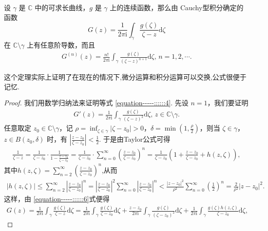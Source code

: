 \documentclass[../../main.tex]{subfiles}%
\begin{document}
\begin{theorem}\label{theorem:定理3.4.2}
设 \( \gamma \) 是 \( \mathbb{C} \) 中的可求长曲线，\( g \) 是 \( \gamma \) 上的连续函数，那么由 Cauchy型积分确定的函数
\[
G(z) = \frac{1}{2\pi \mathrm{i}} \int_{\gamma} \frac{g(\zeta)}{\zeta - z} \mathrm{d}\zeta
\]
在 \( \mathbb{C} \setminus \gamma \) 上有任意阶导数，而且
\begin{align}
G^{(n)}(z) = \frac{n!}{2\pi \mathrm{i}} \int_{\gamma} \frac{g(\zeta)}{(\zeta - z)^{n + 1}} \mathrm{d}\zeta, \, n = 1, 2, \cdots. \label{equation-----::::::4}
\end{align}
\end{theorem}
\begin{note}
这个定理实际上证明了在现在的情况下,微分运算和积分运算可以交换,公式很便于记忆.
\end{note}
\begin{proof}
我们用数学归纳法来证明等式 \eqref{equation-----::::::4}. 先设 \( n = 1 \)，我们要证明
\begin{align}\label{equation-----::::::5}
G'(z) = \frac{1}{2\pi \mathrm{i}} \int_{\gamma} \frac{g(\zeta)}{(\zeta - z)^2} \mathrm{d}\zeta, \, z \in \mathbb{C} \setminus \gamma. 
\end{align}
任意取定 \( z_0 \in \mathbb{C} \setminus \gamma \)，记 \( \rho = \inf_{\zeta \in \gamma} |\zeta - z_0| > 0 \)，\( \delta = \min\left(1, \frac{\rho}{2}\right) \)，则当 \( \zeta \in \gamma \)，\( z \in B(z_0, \delta) \) 时，有 \( \left| \frac{z - z_0}{\zeta - z_0} \right| < \frac{1}{2} \). 于是由Taylor公式可得
\begin{align}\label{equation-----::::::6}
\frac{1}{\zeta -z}=\frac{1}{\zeta -z_0}\cdot \frac{1}{1-\frac{z-z_0}{\zeta -z_0}}=\frac{1}{\zeta -z_0}\cdot \sum_{n=0}^{\infty}{\left( \frac{z-z_0}{\zeta -z_0} \right) ^n}=\frac{1}{\zeta -z_0}\left( 1+\frac{z-z_0}{\zeta -z_0}+h(z,\zeta ) \right) ,
\end{align}
其中$h(z,\zeta)=\sum_{n=2}^{\infty}{\left( \frac{z-z_0}{\zeta -z_0} \right)^n}$,从而
\begin{align}\label{equation-----::::::7}
|h(z,\zeta )|\leqslant \sum_{n=2}^{\infty}{\left| \frac{z-z_0}{\zeta -z_0} \right|^n}=\left| \frac{z-z_0}{\zeta -z_0} \right|^2\sum_{n=0}^{\infty}{\left| \frac{z-z_0}{\zeta -z_0} \right|^n}<\frac{|z-z_0|^2}{\rho ^2}\sum_{n=0}^{\infty}{\left( \frac{1}{2} \right) ^n}=\frac{2}{\rho ^2}|z-z_0|^2.
\end{align}
这样，由 \eqref{equation-----::::::6}式便得
\begin{align*}
G(z) = \frac{1}{2\pi \mathrm{i}} \int_{\gamma} \frac{g(\zeta)}{\zeta - z} \mathrm{d}\zeta = \frac{1}{2\pi \mathrm{i}} \int_{\gamma} \frac{g(\zeta)}{\zeta - z_0} \mathrm{d}\zeta + \frac{z - z_0}{2\pi \mathrm{i}} \int_{\gamma} \frac{g(\zeta)}{(\zeta - z_0)^2} \mathrm{d}\zeta   + \frac{1}{2\pi \mathrm{i}} \int_{\gamma} \frac{g(\zeta)h(z, \zeta)}{\zeta - z_0} \mathrm{d}\zeta,

\end{align*}
\end{proof}
\end{document}
